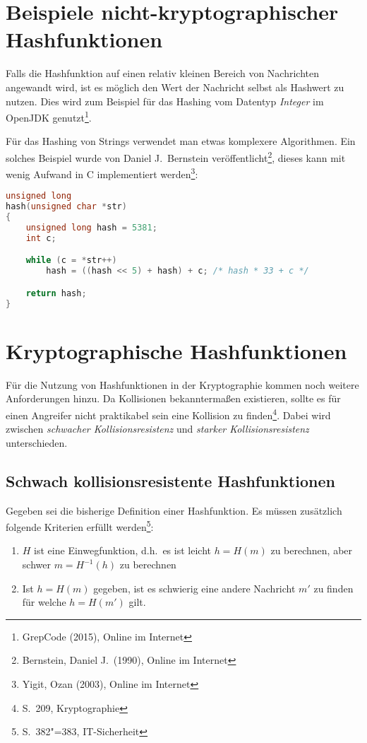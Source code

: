 \section{Beispiele nicht-kryptographischer Hashfunktionen}

Falls die Hashfunktion auf einen relativ kleinen Bereich von
Nachrichten angewandt wird, ist es möglich den Wert der Nachricht
selbst als Hashwert zu nutzen.  Dies wird zum Beispiel für das Hashing
vom Datentyp \emph{Integer} im OpenJDK genutzt\footnote{GrepCode
  (2015), Online im Internet}.

Für das Hashing von Strings verwendet man etwas komplexere
Algorithmen.  Ein solches Beispiel wurde von Daniel J.~Bernstein
veröffentlicht\footnote{Bernstein, Daniel J.~(1990), Online im
  Internet}, dieses kann mit wenig Aufwand in C implementiert
werden\footnote{Yigit, Ozan (2003), Online im Internet}:

\begin{lstlisting}[language=C,basicstyle=\ttfamily\footnotesize,keywordstyle=\bfseries\color{black},captionpos=b,caption={djb2}]
unsigned long
hash(unsigned char *str)
{
    unsigned long hash = 5381;
    int c;

    while (c = *str++)
        hash = ((hash << 5) + hash) + c; /* hash * 33 + c */

    return hash;
}
\end{lstlisting}

\section{Kryptographische Hashfunktionen}

Für die Nutzung von Hashfunktionen in der Kryptographie kommen noch
weitere Anforderungen hinzu.  Da Kollisionen bekanntermaßen
existieren, sollte es für einen Angreifer nicht praktikabel sein eine
Kollision zu finden\footnote{S.~209, Kryptographie}.  Dabei wird
zwischen \emph{schwacher Kollisionsresistenz} und \emph{starker
  Kollisionsresistenz} unterschieden.

\subsection{Schwach kollisionsresistente Hashfunktionen}

Gegeben sei die bisherige Definition einer Hashfunktion.  Es müssen
zusätzlich folgende Kriterien erfüllt werden\footnote{S.~382"=383,
  IT-Sicherheit}:

\begin{enumerate}
\item $H$ ist eine Einwegfunktion, d.h.~es ist leicht $h = H(m)$ zu
  berechnen, aber schwer $m = H^{-1}(h)$ zu berechnen
\item Ist $h = H(m)$ gegeben, ist es schwierig eine andere Nachricht
  $m'$ zu finden für welche $h = H(m')$ gilt.
\end{enumerate}

